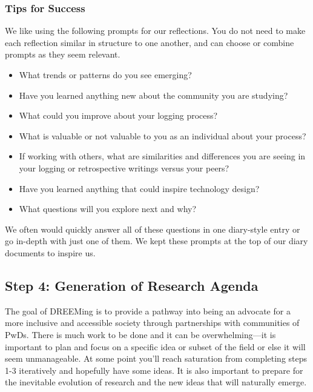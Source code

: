\subsubsection{Tips for Success}
We like using the following prompts for our reflections. You do not need to make each reflection similar in structure to one another, and can choose or combine prompts as they seem relevant. 
\begin{itemize}
\item What trends or patterns do you see emerging?
\item Have you learned anything new about the community you are studying?
\item What could you improve about your logging process?
\item What is valuable or not valuable to you as an individual about your process? 
\item If working with others, what are similarities and differences you are seeing in your logging or retrospective writings versus your peers?
\item Have you learned anything that could inspire technology design?
\item What questions will you explore next and why? 
\end{itemize}
We often would quickly answer all of these questions in one diary-style entry or go in-depth with just one of them. We kept these prompts at the top of our diary documents to inspire us.

\subsection{Step 4: Generation of Research Agenda}
The goal of DREEMing is to provide a pathway into being an advocate for a more inclusive and accessible society through partnerships with communities of PwDs. There is much work to be done and it can be overwhelming—it is important to plan and focus on a specific idea or subset of the field or else it will seem unmanageable. At some point you'll reach saturation from completing steps 1-3 iteratively and hopefully have some ideas. It is also important to prepare for the inevitable evolution of research and the new ideas that will naturally emerge. 

